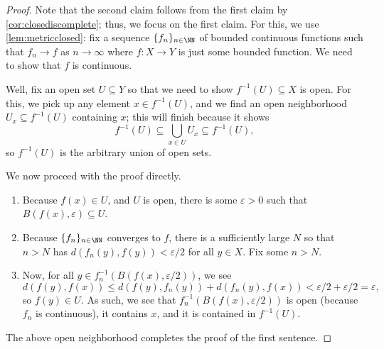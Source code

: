\documentclass[../notes.tex]{subfiles}
\begin{document}
\begin{proof}
	Note that the second claim follows from the first claim by \autoref{cor:closediscomplete}; thus, we focus on the first claim. For this, we use \autoref{lem:metricclosed}: fix a sequence $\{f_n\}_{n\in\NN}$ of bounded continuous functions such that $f_n\to f$ as $n\to\infty$ where $f\colon X\to Y$ is just some bounded function. We need to show that $f$ is continuous.

	Well, fix an open set $U\subseteq Y$ so that we need to show $f^{-1}(U)\subseteq X$ is open. For this, we pick up any element $x\in f^{-1}(U)$, and we find an open neighborhood $U_x\subseteq f^{-1}(U)$ containing $x$; this will finish because it shows
	\[f^{-1}(U)\subseteq\bigcup_{x\in U}U_x\subseteq f^{-1}(U),\]
	so $f^{-1}(U)$ is the arbitrary union of open sets.

	We now proceed with the proof directly.
	\begin{enumerate}
		\item Because $f(x)\in U$, and $U$ is open, there is some $\varepsilon>0$ such that $B(f(x),\varepsilon)\subseteq U$.
		\item Because $\{f_n\}_{n\in\NN}$ converges to $f$, there is a sufficiently large $N$ so that $n>N$ has $d(f_n(y),f(y))<\varepsilon/2$ for all $y\in X$. Fix some $n>N$.
		\item Now, for all $y\in f_n^{-1}(B(f(x),\varepsilon/2))$, we see
		\[d(f(y),f(x))\le d(f(y),f_n(y))+d(f_n(y),f(x))<\varepsilon/2+\varepsilon/2=\varepsilon,\]
		so $f(y)\in U$. As such, we see that $f_n^{-1}(B(f(x),\varepsilon/2))$ is open (because $f_n$ is continuous), it contains $x$, and it is contained in $f^{-1}(U)$.
	\end{enumerate}
	The above open neighborhood completes the proof of the first sentence.
\end{proof}
\end{document}
